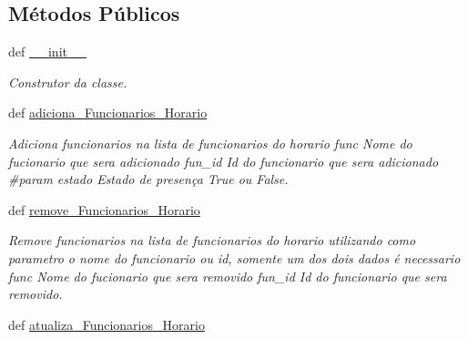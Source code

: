 \subsection*{\-Métodos \-Públicos}
\begin{DoxyCompactItemize}
\item 
\hypertarget{classview_1_1Controle__De__Acesso__Window_a2816bead2b94b8fb314fd9c6a26bb904}{def \hyperlink{classview_1_1Controle__De__Acesso__Window_a2816bead2b94b8fb314fd9c6a26bb904}{\-\_\-\-\_\-init\-\_\-\-\_\-}}\label{classview_1_1Controle__De__Acesso__Window_a2816bead2b94b8fb314fd9c6a26bb904}

\begin{DoxyCompactList}\small\item\em \-Construtor da classe. \end{DoxyCompactList}\item 
\hypertarget{classview_1_1Controle__De__Acesso__Window_a32779035719725dc613616808913bacf}{def \hyperlink{classview_1_1Controle__De__Acesso__Window_a32779035719725dc613616808913bacf}{adiciona\-\_\-\-Funcionarios\-\_\-\-Horario}}\label{classview_1_1Controle__De__Acesso__Window_a32779035719725dc613616808913bacf}

\begin{DoxyCompactList}\small\item\em \-Adiciona funcionarios na lista de funcionarios do horario  func \-Nome do fucionario que sera adicionado  fun\-\_\-id \-Id do funcionario que sera adicionado \#param estado \-Estado de presença \-True ou \-False. \end{DoxyCompactList}\item 
\hypertarget{classview_1_1Controle__De__Acesso__Window_a87d6e80a75e9de6f8d6191595e1feeaf}{def \hyperlink{classview_1_1Controle__De__Acesso__Window_a87d6e80a75e9de6f8d6191595e1feeaf}{remove\-\_\-\-Funcionarios\-\_\-\-Horario}}\label{classview_1_1Controle__De__Acesso__Window_a87d6e80a75e9de6f8d6191595e1feeaf}

\begin{DoxyCompactList}\small\item\em \-Remove funcionarios na lista de funcionarios do horario utilizando como parametro o nome do funcionario ou id, somente um dos dois dados é necessario  func \-Nome do fucionario que sera removido  fun\-\_\-id \-Id do funcionario que sera removido. \end{DoxyCompactList}\item 
\hypertarget{classview_1_1Controle__De__Acesso__Window_a3cf8b394e8dfbeb0aa2f6d5825379198}{def \hyperlink{classview_1_1Controle__De__Acesso__Window_a3cf8b394e8dfbeb0aa2f6d5825379198}{atualiza\-\_\-\-Funcionarios\-\_\-\-Horario}}\label{classview_1_1Controle__De__Acesso__Window_a3cf8b394e8dfbeb0aa2f6d5825379198}


\end{DoxyCompactItemize}
